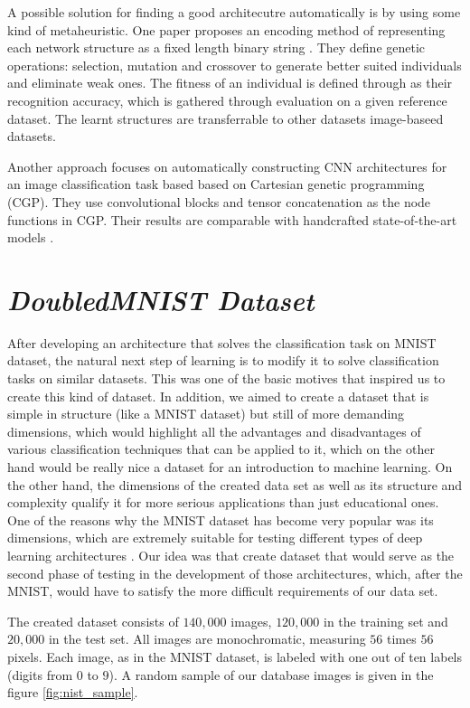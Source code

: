 \documentclass[eng]{simposium}
\begin{document}
A possible solution for finding a good architecutre automatically is by using some kind of metaheuristic. 
One paper proposes an encoding method of representing each network structure as a fixed length binary string \cite{4}. 
They define genetic operations: selection, mutation and crossover to generate better suited individuals and eliminate weak ones.
The fitness of an individual is defined through as their recognition accuracy, which is gathered through evaluation on a given reference dataset.
The learnt structures are transferrable to other datasets image-baseed datasets.

Another approach focuses on automatically constructing CNN architectures for an image classification task based based on Cartesian genetic programming (CGP).
They use convolutional blocks and tensor concatenation as the node functions in CGP. Their results are comparable with handcrafted state-of-the-art models \cite{5}.

\section{\textit{DoubledMNIST Dataset}}

After developing an architecture that solves the classification task on MNIST dataset, the natural next step of learning is 
to modify it to solve classification tasks on similar datasets. 
This was one of the basic motives that inspired us to create this kind of dataset. 
In addition, we aimed to create a dataset that is simple in structure (like a MNIST dataset) but still of more demanding 
dimensions, which would highlight all the advantages and disadvantages of various classification techniques that can be 
applied to it, which on the other hand would be really nice a dataset for an introduction to machine learning. 
On the other hand, the dimensions of the created data set as well as its structure and complexity qualify it for more 
serious applications than just educational ones. 
One of the reasons why the MNIST dataset has become very popular was its dimensions, which are extremely suitable for 
testing different types of deep learning architectures \cite{27}. 
Our idea was that create dataset that would serve as the second phase of testing in the development of those architectures, 
which, after the MNIST, would have to satisfy the more difficult requirements of our data set. 

The created dataset consists of $140,000$ images, $120,000$ in the training set and $20,000$ in the test set. 
All images are monochromatic, measuring $56$ times $56$ pixels. 
Each image, as in the MNIST dataset, is labeled with one out of ten labels (digits from $0$ to $9$). 
A random sample of our database images is given in the figure \ref{fig:nist_sample}. 
\end{document}
